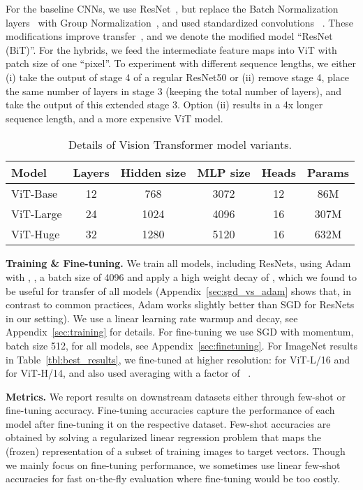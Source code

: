 \documentclass{article} \usepackage{iclr2021_conference,times}
\newcommand{\oursabbrv}{ViT\xspace}
\newcommand{\oursfull}{Vision Transformer\xspace}
\newcommand{\imagenet}{ImageNet\xspace}
\begin{document}
For the baseline CNNs, we use ResNet~\citep{he2016deep}, but replace the Batch Normalization layers~\citep{ioffe2015batch} with Group Normalization~\citep{wu2018group}, and used standardized convolutions~
\citep{salimans2016weight}.
These modifications improve transfer~\citep{kolesnikov2020-bit}, and we denote the modified model ``ResNet (BiT)''.
For the hybrids, we feed the intermediate feature maps into \oursabbrv{} with patch size of one ``pixel''.
To experiment with different sequence lengths, we either
(i) take the output of stage 4 of a regular ResNet50 or
(ii) remove stage 4, place the same number of layers in stage 3 (keeping the total number of layers), and take the output of this extended stage 3.
Option (ii) results in a 4x longer sequence length, and a more expensive \oursabbrv{} model.

\begin{table}[t]
\centering
\small
\begin{tabular}{l c c c c c}
\toprule
Model            & Layers & Hidden size  & MLP size &  Heads  & Params \\
\midrule 
\oursabbrv-Base   &   12   &        768      &   3072   &   12    &   86M  \\
\oursabbrv-Large  &   24   &       1024      &   4096   &   16    &  307M  \\
\oursabbrv-Huge   &   32   &       1280      &   5120   &   16    &  632M  \\
\bottomrule
\end{tabular}
\caption{Details of \oursfull model variants.}
\label{tbl:models}
\end{table}

\textbf{Training \& Fine-tuning.}
We train all models, including ResNets, using Adam with , , a batch size of 4096 and apply a high weight decay of , which we found to be useful for transfer of all models (Appendix~\ref{sec:sgd_vs_adam} shows that, in contrast to common practices, Adam works slightly better than SGD for ResNets in our setting).
We use a linear learning rate warmup and decay, see Appendix~\ref{sec:training} for details.
For fine-tuning we use SGD with momentum, batch size 512, for all models, see Appendix~\ref{sec:finetuning}.
For \imagenet results in Table~\ref{tbl:best_results}, we fine-tuned at higher resolution:  for \oursabbrv-L/16 and  for \oursabbrv-H/14, and also used \citet{polyak} averaging with a factor of ~\citep{ramachandran19-sasa,wang2020axial}.


\textbf{Metrics.}
We report results on downstream datasets either through few-shot or fine-tuning accuracy.
Fine-tuning accuracies capture the performance of each model after fine-tuning it on the respective dataset.
Few-shot accuracies are obtained by solving a regularized linear regression problem that maps the (frozen) representation of a subset of training images to  target vectors.
Though we mainly focus on fine-tuning performance, we sometimes use linear few-shot accuracies for fast on-the-fly evaluation where fine-tuning would be too costly.
\end{document}

